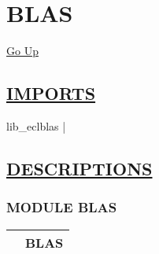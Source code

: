 \chapter*{\color{headfile}
BLAS
}
\hypertarget{ecldoc:toc:BLAS}{}
\hyperlink{ecldoc:toc:root}{Go Up}

\section*{\underline{\textsf{IMPORTS}}}
\begin{doublespace}
{\large
lib\_eclblas |
}
\end{doublespace}

\section*{\underline{\textsf{DESCRIPTIONS}}}
\subsection*{\textsf{\colorbox{headtoc}{\color{white} MODULE}
BLAS}}

\hypertarget{ecldoc:BLAS}{}

{\renewcommand{\arraystretch}{1.5}
\begin{tabularx}{\textwidth}{|>{\raggedright\arraybackslash}l|X|}
\hline
\hspace{0pt}\mytexttt{\color{red} } & \textbf{BLAS} \\
\hline
\end{tabularx}
}

\par


